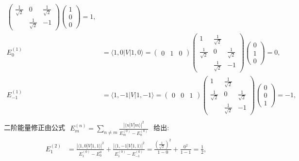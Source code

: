 \documentclass[../../main.tex]{subfiles}
\begin{document}
\begin{enumerate}
\begin{enumerate}
{{\begin{align*}
\begin{pmatrix}
        \frac{1}{\sqrt{2}} & 0  & \frac{1}{\sqrt{2}}\\
          & \frac{1}{\sqrt{2}} & -1
       \end{pmatrix}\begin{pmatrix}
          1\\
          0\\
          0
       \end{pmatrix} = \boxed{1},\\
       E_{0}^{(1)} &= \langle 1,0|V|1,0\rangle = \begin{pmatrix}
        0 & 1 & 0
      \end{pmatrix}\begin{pmatrix}
        1 & \frac{1}{\sqrt{2}}& \\
        \frac{1}{\sqrt{2}} & 0  & \frac{1}{\sqrt{2}}\\
          & \frac{1}{\sqrt{2}} & -1
       \end{pmatrix}\begin{pmatrix}
          0\\
          1\\
          0
       \end{pmatrix} = \boxed{0},\\
       E_{-1}^{(1)} &= \langle 1,-1|V|1,-1\rangle = \begin{pmatrix}
        0 & 0 & 1
      \end{pmatrix}\begin{pmatrix}
        1 & \frac{1}{\sqrt{2}}& \\
        \frac{1}{\sqrt{2}} & 0  & \frac{1}{\sqrt{2}}\\
          & \frac{1}{\sqrt{2}} & -1
       \end{pmatrix}\begin{pmatrix}
          0\\
          0\\
          1
       \end{pmatrix} = \boxed{-1},\\
    \end{align*}
    二阶能量修正由公式 $\begin{aligned}
      E_{m}^{(n)} = \sum_{n\neq m}\frac{|\langle n|V|m\rangle|^{2}}{E_{m}^{(0)} - E_{n}^{(0)}}
    \end{aligned}$ 给出:
    \begin{align*}
      E_{1}^{(2)} &= \frac{|\langle 1,0|V|1,1\rangle|^{2}}{E_{1}^{(0)}-E_{0}^{0}} + \frac{|\langle 1,-1|V|1,1\rangle|^{2}}{E_{1}^{(0)} - E_{-1}^{(0)}} = \frac{\left(\frac{1}{\sqrt{2}}\right)^{2}}{1 - 0} + \frac{0^{2}}{1 - 1} = \boxed{\frac{1}{2}},\\

\end{align*}}}
\end{enumerate}
\end{enumerate}
\end{document}
